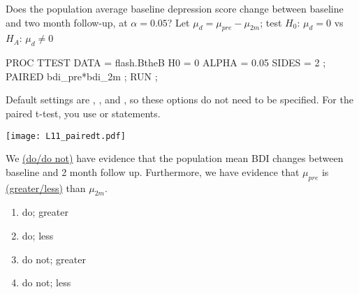 \begin{frame}[fragile]
Does the population average baseline depression score change between baseline and two month follow-up, at $\alpha=0.05$?  Let $\mu_d=\mu_{pre} -\mu_{2m}$; test $H_0$: $\mu_d=0$ vs  $H_A$:  $\mu_d \neq 0$ \\
\vskip10pt
\footnotesize
\begin{code}{.0}
PROC TTEST DATA = flash.BtheB H0 = 0 ALPHA = 0.05 SIDES = 2 ;
   PAIRED bdi_pre*bdi_2m ;
RUN ;
\end{code}
\emp
\vskip10pt
Default settings are , , and , so these options do not need to be specified.
\vskip10pt
For the paired t-test, you  use  or  statements.
\end{frame}

\begin{frame}[fragile]
\texttt{[image: L11\_pairedt.pdf]}
\emp
{} \hspace{1in} \emp
{}
\begin{clicker}{We \underline{(do/do not)} have evidence that the population mean BDI changes between baseline and 2 month follow up.  Furthermore, we have evidence that $\mu_{pre}$ is \underline{(greater/less)} than $\mu_{2m}$.}
\begin{enumerate}
\item do; greater
\item do; less
\item do not; greater
\item do not; less
\end{enumerate}
\end{clicker}
\emp
\end{frame}


%
%
%
%
%
%



